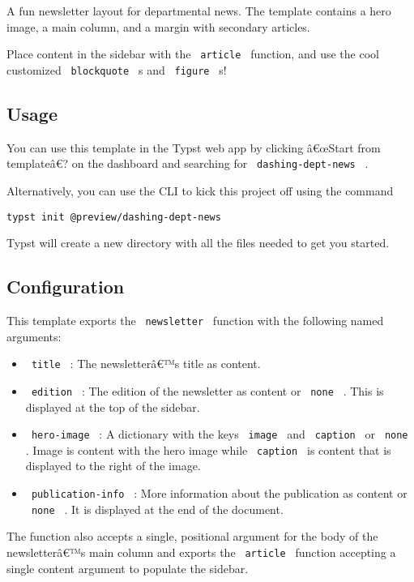 \label{readme}
A fun newsletter layout for departmental news. The template contains a
hero image, a main column, and a margin with secondary articles.

Place content in the sidebar with the \texttt{\ article\ } function, and
use the cool customized \texttt{\ blockquote\ } s and
\texttt{\ figure\ } s!

\subsection{Usage}\label{usage}

You can use this template in the Typst web app by clicking â€œStart from
templateâ€? on the dashboard and searching for
\texttt{\ dashing-dept-news\ } .

Alternatively, you can use the CLI to kick this project off using the
command

\begin{verbatim}
typst init @preview/dashing-dept-news
\end{verbatim}

Typst will create a new directory with all the files needed to get you
started.

\subsection{Configuration}\label{configuration}

This template exports the \texttt{\ newsletter\ } function with the
following named arguments:

\begin{itemize}
\tightlist
\item
  \texttt{\ title\ } : The newsletterâ€™s title as content.
\item
  \texttt{\ edition\ } : The edition of the newsletter as content or
  \texttt{\ none\ } . This is displayed at the top of the sidebar.
\item
  \texttt{\ hero-image\ } : A dictionary with the keys
  \texttt{\ image\ } and \texttt{\ caption\ } or \texttt{\ none\ } .
  Image is content with the hero image while \texttt{\ caption\ } is
  content that is displayed to the right of the image.
\item
  \texttt{\ publication-info\ } : More information about the publication
  as content or \texttt{\ none\ } . It is displayed at the end of the
  document.
\end{itemize}

The function also accepts a single, positional argument for the body of
the newsletterâ€™s main column and exports the \texttt{\ article\ }
function accepting a single content argument to populate the sidebar.

